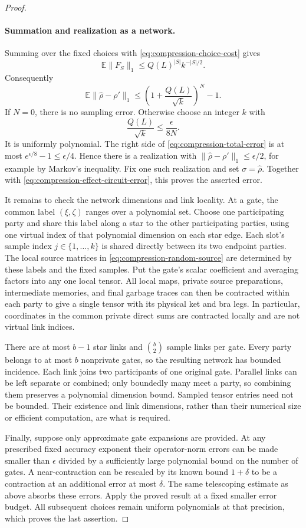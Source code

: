 \documentclass[11pt]{article}
\numberwithin{equation}{section}
\theoremstyle{definition}
\theoremstyle{remark}
\newcommand{\norm}[1]{\lVert #1\rVert}
\begin{document}
\begin{proof}
\paragraph{Summation and realization as a network.}
Summing over the fixed choices with
\eqref{eq:compression-choice-cost} gives
\[
 \mathbb E\norm{F_S}_1\le Q(L)^{|S|}k^{-|S|/2}.
\]
Consequently
\begin{equation}
 \mathbb E\norm{\widehat\rho-\rho'}_1
 \le\left(1+\frac{Q(L)}{\sqrt k}\right)^N-1.
 \label{eq:compression-total-error}
\end{equation}
If $N=0$, there is no sampling error.  Otherwise choose an integer
$k$ with
\[
 \frac{Q(L)}{\sqrt k}\le\frac{\epsilon}{8N}.
\]
It is uniformly polynomial.  The right side of
\eqref{eq:compression-total-error} is at most
$e^{\epsilon/8}-1\le\epsilon/4$.  Hence there is a realization with
$\norm{\widehat\rho-\rho'}_1\le\epsilon/2$, for example by Markov's
inequality.  Fix one such realization and set $\sigma=\widehat\rho$.
Together with \eqref{eq:compression-effect-circuit-error}, this proves
the asserted error.

It remains to check the network dimensions and link locality.  At a
gate, the common label $(\xi,\zeta)$ ranges over a polynomial set.
Choose one participating party and share this label along a star to
the other participating parties, using one virtual index of that
polynomial dimension on each star edge.  Each slot's sample index
$j\in\{1,\ldots,k\}$ is shared directly between its two endpoint
parties.  The local source matrices in
\eqref{eq:compression-random-source} are determined by these labels
and the fixed samples.  Put the gate's scalar coefficient and averaging
factors into any one local tensor.  All local maps, private source
preparations, intermediate memories, and final garbage traces can then
be contracted within each party to give a single tensor with its
physical ket and bra legs.  In particular, coordinates in the common
private direct sums are contracted locally and are not virtual link
indices.

There are at most $b-1$ star links and $\binom b2$ sample links per
gate.  Every party belongs to at most $b$ nonprivate gates, so the
resulting network has bounded incidence.  Each link joins two
participants of one original gate.  Parallel links can be left
separate or combined; only boundedly many meet a party, so combining
them preserves a polynomial dimension bound.  Sampled tensor entries
need not be bounded.  Their existence and link dimensions, rather than
their numerical size or efficient computation, are what is required.

Finally, suppose only approximate gate expansions are provided.  At
any prescribed fixed accuracy exponent their operator-norm errors can
be made smaller than $\epsilon$ divided by a sufficiently large
polynomial bound on the number of gates.  A near-contraction can be
rescaled by its known bound $1+\delta$ to be a contraction at an
additional error at most $\delta$.  The same telescoping estimate as
above absorbs these errors.  Apply the proved result at a fixed
smaller error budget.  All subsequent choices remain uniform
polynomials at that precision, which proves the last assertion.
\end{proof}
\end{document}
